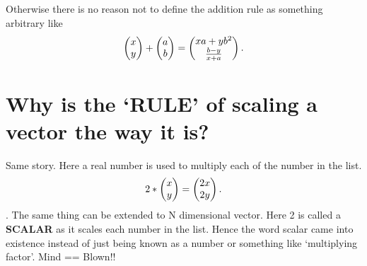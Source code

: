 \documentclass[../main.tex]{subfiles}
\begin{document}
Otherwise there is no reason not to define the addition rule as something arbitrary like
\[
\blockcomment{Column-Vector: x,y} \begin{pmatrix} x \\ y \end{pmatrix} + \blockcomment{Column-Vector: a,b} \begin{pmatrix} a \\ b \end{pmatrix} = 
\blockcomment{Column-Vector: xa + yb^2, \frac{b - y}{x + a}} \begin{pmatrix} xa + yb^2 \\  \frac{b - y}{x + a} \end{pmatrix}
.\]

\section{Why is the `RULE' of scaling a vector the way it is?}
Same story. Here a real number is used to multiply each of the number in the list.
\[
2 * \blockcomment{Column-Vector: x, y} \begin{pmatrix} x \\  y \end{pmatrix} = \blockcomment{Column-Vector: 2x, 2y} \begin{pmatrix} 2x \\  2y \end{pmatrix}
.\]. The same thing can be extended to N dimensional vector. Here 2 is called a \textbf{SCALAR} as it scales each number in the list. Hence the word scalar came into existence instead of just being known as a number or something like `multiplying factor'. Mind == Blown!!
\end{document}
